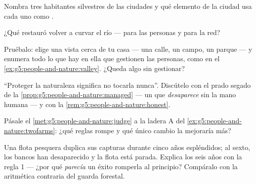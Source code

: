 \begin{exercise}[$\star$]\label{exo:g5:people-and-nature:6}
Nombra tres habitantes silvestres de las ciudades y qué elemento de la
ciudad usa cada uno como .
\end{exercise}

\begin{exercise}[$\star$]\label{exo:g5:people-and-nature:7}
¿Qué restauró volver a curvar el río --- para las personas y para la
red?
\end{exercise}

\begin{exercise}[$\star$]\label{exo:g5:people-and-nature:8}
Pruébalo: elige una vista cerca de tu casa --- una calle, un campo, un
parque --- y enumera todo lo que hay en ella que gestionen las
personas, como en el \cref{ex:g5:people-and-nature:valley}. ¿Queda
algo sin gestionar?
\end{exercise}

\begin{exercise}[$\star\star$]\label{exo:g5:people-and-nature:9}
``Proteger la naturaleza significa no tocarla nunca''. Discútelo con
el prado segado de la \cref{prop:g5:people-and-nature:managed} --- un
 que \emph{desaparece} sin la mano humana --- y con la
\cref{rem:g5:people-and-nature:honest}.
\end{exercise}

\begin{exercise}[$\star\star$]\label{exo:g5:people-and-nature:10}
Pásale el \cref{met:g5:people-and-nature:judge} a la ladera A del
\cref{ex:g5:people-and-nature:twofarms}: ¿qué reglas rompe y qué
único cambio la mejoraría más?
\end{exercise}

\begin{exercise}[$\star\star\star$]\label{exo:g5:people-and-nature:11}
Una flota pesquera duplica sus capturas durante cinco años
espléndidos; al sexto, los bancos han desaparecido y la flota está
parada. Explica los seis años con la regla 1 --- ¿por qué
\emph{parecía} un éxito romperla al principio? Compáralo con la
aritmética contraria del guarda forestal.
\end{exercise}
